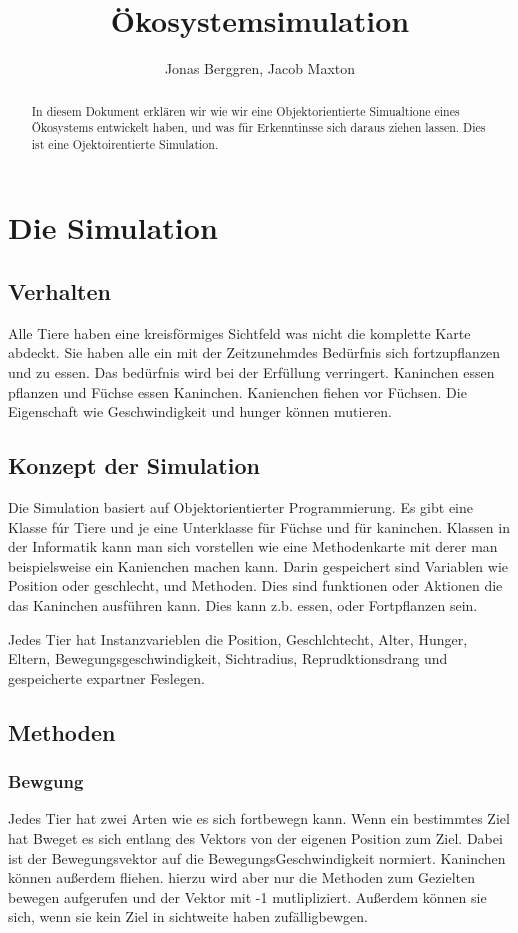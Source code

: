 \documentclass[12pt]{article}
\author{{\Large Jonas Berggren, Jacob Maxton}}
\title{{\myfont Ökosystemsimulation}}
\begin{document}
\maketitle
\tableofcontents
\newpage
\begin{abstract}
In diesem Dokument erklären wir wie wir eine Objektorientierte Simualtione eines Ökosystems entwickelt haben, und was für Erkenntinsse sich daraus ziehen lassen.
Dies ist eine Ojektoirentierte Simulation.
\end{abstract}

\section{Die Simulation}
\subsection{Verhalten}
Alle Tiere haben eine kreisförmiges Sichtfeld was nicht die komplette Karte abdeckt.
Sie haben alle ein mit der Zeitzunehmdes Bedürfnis sich fortzupflanzen und zu essen.
Das bedürfnis wird bei der Erfüllung verringert.
Kaninchen essen pflanzen und Füchse essen Kaninchen.
Kanienchen fiehen vor Füchsen.
Die Eigenschaft wie Geschwindigkeit und hunger können mutieren.
\subsection{Konzept der Simulation}
Die Simulation basiert auf Objektorientierter Programmierung.
Es gibt eine Klasse fúr Tiere und je eine Unterklasse für Füchse und für kaninchen.
Klassen in der Informatik kann man sich vorstellen wie eine Methodenkarte mit derer man beispielsweise ein Kanienchen machen kann.
Darin gespeichert sind Variablen wie Position oder geschlecht, und Methoden.
Dies sind funktionen oder Aktionen die das Kaninchen ausführen kann.
Dies kann z.b. essen, oder Fortpflanzen sein.

Jedes Tier hat Instanzvarieblen die Position, Geschlchtecht, Alter, Hunger, Eltern, Bewegungsgeschwindigkeit, Sichtradius, Reprudktionsdrang und gespeicherte expartner Feslegen.
\subsection{Methoden}
\subsubsection{Bewgung}
Jedes Tier hat zwei Arten wie es sich fortbewegn kann.
Wenn ein bestimmtes Ziel hat Bweget es sich entlang des Vektors von der eigenen Position zum Ziel.
Dabei ist der Bewegungsvektor auf die BewegungsGeschwindigkeit normiert.
Kaninchen können außerdem fliehen.
hierzu wird aber nur die Methoden zum Gezielten bewegen aufgerufen und der Vektor mit -1 mutlipliziert.
Außerdem können sie sich, wenn sie kein Ziel in sichtweite haben zufälligbewgen.
\end{document}
